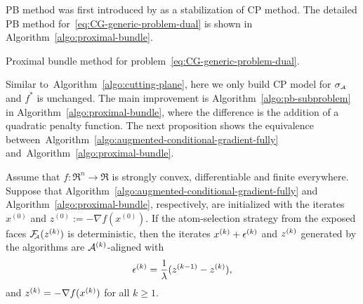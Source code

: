 PB method was first introduced by \citet{kiwiel1990proximity} as a stabilization of CP method. The detailed PB method for~\eqref{eq:CG-generic-problem-dual} is shown in Algorithm~\ref{algo:proximal-bundle}. 

\begin{algorithm}[t]
  \DontPrintSemicolon\setcounter{AlgoLine}{-1}
  \caption{Proximal bundle method for problem~\eqref{eq:CG-generic-problem-dual}.}
  \label{algo:proximal-bundle}
\end{algorithm}

Similar to~Algorithm~\ref{algo:cutting-plane}, here we only build CP model for $\sigma_{\scriptscriptstyle\mathcal{A}}$ and $f^*$ is unchanged. The main improvement is Algorithm~\ref{algo:pb-subproblem} in Algorithm~\ref{algo:proximal-bundle}, where the difference is the addition of a quadratic penalty function. The next proposition shows the equivalence between~Algorithm~\ref{algo:augmented-conditional-gradient-fully} and~Algorithm~\ref{algo:proximal-bundle}. 

\begin{proposition} \label{prop:equi_alfccg_pn} Assume that $f:\Re^n\to\Re$ is strongly convex, differentiable and finite everywhere. Suppose that Algorithm~\ref{algo:augmented-conditional-gradient-fully} and Algorithm~\ref{algo:proximal-bundle},
  respectively, are initialized with the iterates $x^{(0)}$ and $z^{(0)} :=
  -\nabla f(x^{(0)})$. If the atom-selection strategy from the exposed faces
  $\mathcal{F}_{\!\!\scriptscriptstyle\mathcal{A}}(z^{(k)})$ is deterministic, then the iterates $x^{(k)} + \epsilon^{(k)}$ and $z^{(k)}$ generated by the algorithms are $\mathcal{A}^{(k)}$-aligned with 
  \[\epsilon^{(k)} = \frac{1}{\lambda}(z^{(k-1)} - z^{(k)}),\]
  and $z^{(k)} = -\nabla f(x^{(k)})$ for all $k\ge1$. 
\end{proposition}

